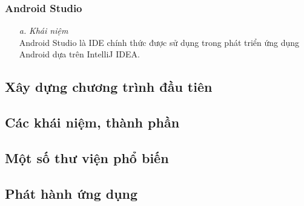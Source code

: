 \subsubsection{Android Studio}
\begin{enumerate}
    \item[\textit{a.}] {\textit{Khái niệm}}\\
    Android Studio là IDE chính thức được sử dụng trong phát triển ứng dụng Android dựa trên IntelliJ IDEA.\\
    
    \item[] 
\end{enumerate}

\subsection{Xây dựng chương trình đầu tiên}

\subsection{Các khái niệm, thành phần}

\subsection{Một số thư viện phổ biến}

\subsection{Phát hành ứng dụng}
